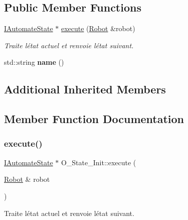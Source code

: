 \subsection*{Public Member Functions}
\begin{DoxyCompactItemize}
\item 
\hyperlink{classIAutomateState}{I\+Automate\+State} $\ast$ \hyperlink{classO__State__Init_abc19788b7457d1f819245dd28367fe91}{execute} (\hyperlink{classRobot}{Robot} \&robot)
\begin{DoxyCompactList}\small\item\em Traite l\textquotesingle{}état actuel et renvoie l\textquotesingle{}état suivant. \end{DoxyCompactList}\item 
\mbox{\label{classO__State__Init_a7a5b6b98638111be7851f181e1334449}} 
std\+::string {\bfseries name} ()
\end{DoxyCompactItemize}
\subsection*{Additional Inherited Members}


\subsection{Member Function Documentation}
\mbox{\label{classO__State__Init_abc19788b7457d1f819245dd28367fe91}} 
\subsubsection{\texorpdfstring{execute()}{execute()}}
{\footnotesize\ttfamily \hyperlink{classIAutomateState}{I\+Automate\+State} $\ast$ O\+\_\+\+State\+\_\+\+Init\+::execute (\begin{DoxyParamCaption}\item[{\hyperlink{classRobot}{Robot} \&}]{robot }\end{DoxyParamCaption})\hspace{0.3cm}{\ttfamily [virtual]}}



Traite l\textquotesingle{}état actuel et renvoie l\textquotesingle{}état suivant. 

